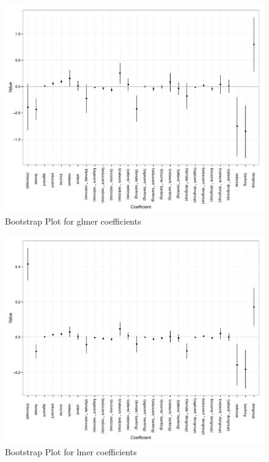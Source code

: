 \documentclass[11pt,article,oneside]{memoir}
\begin{document}
\begin{landscape}
\begin{figure}[h]
\caption{Bootstrap Plot for glmer coefficients \label{fig:boot1plot}}
\includegraphics[width=8in]{figures/boot1plot.pdf}
\end{figure}
\end{landscape}
\restoregeometry

\begin{landscape}
\begin{figure}[h]
\caption{Bootstrap Plot for lmer coefficients \label{fig:boot2plot}}
\includegraphics[width=8in]{figures/boot2plot.pdf}
\end{figure}
\end{landscape}
\restoregeometry
\end{document}
